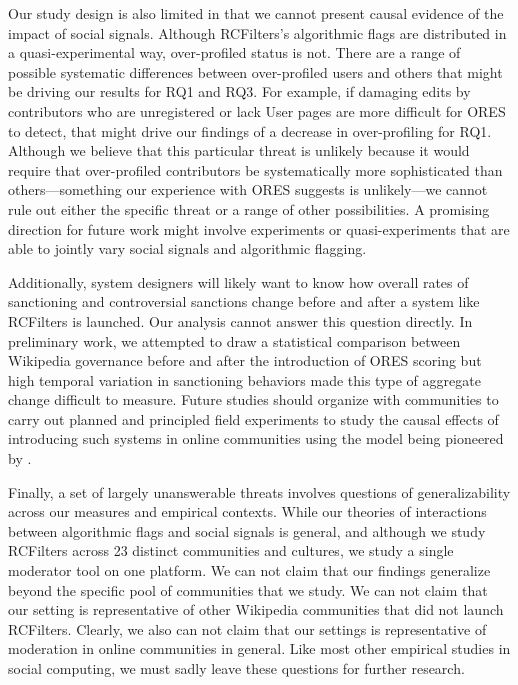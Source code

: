\documentclass[format=acmsmall, natbib=true,  screen=true]{acmart}
\begin{document}
Our study design is also limited in that we cannot present causal evidence of the impact of social signals. Although RCFilters's algorithmic flags are distributed in a quasi-experimental way, over-profiled status is not.
There are a range of possible systematic differences between over-profiled users and others that might be driving our results for RQ1 and RQ3.
For example, if damaging edits by contributors who are unregistered or lack User pages are more difficult for ORES to detect, that might drive our findings of a decrease in over-profiling for RQ1. 
Although we believe that this particular threat is unlikely because it would require that over-profiled contributors be systematically more sophisticated than others---something our experience with ORES suggests is unlikely---we cannot rule out either the specific threat or a range of other possibilities. 
A promising direction for future work might involve experiments or quasi-experiments that are able to jointly vary social signals and algorithmic flagging.

Additionally, system designers will likely want to know how overall rates of sanctioning and controversial sanctions change before and after a system like RCFilters is launched. Our analysis cannot answer this question directly.
In preliminary work, we attempted to draw a statistical comparison between Wikipedia governance before and after the introduction of ORES scoring but high temporal variation in sanctioning behaviors made this type of aggregate change difficult to measure. Future studies should organize with communities to carry out planned and principled field experiments to study the causal effects of introducing such systems in online communities using the model being pioneered by \citet{matias_civilservant_2018}. 

Finally, a set of largely unanswerable threats involves questions of generalizability across our measures and empirical contexts.
While our theories of interactions between algorithmic flags and social signals is general, and although we study RCFilters across 23 distinct communities and cultures, we study a single moderator tool on one platform.
We can not claim that our findings generalize beyond the specific pool of communities that we study. 
We can not claim that our setting is representative of other Wikipedia communities that did not launch RCFilters.
Clearly, we also can not claim that our settings is representative of moderation in online communities in general. 
Like most other empirical studies in social computing, we must sadly leave these questions for further research.
\end{document}
